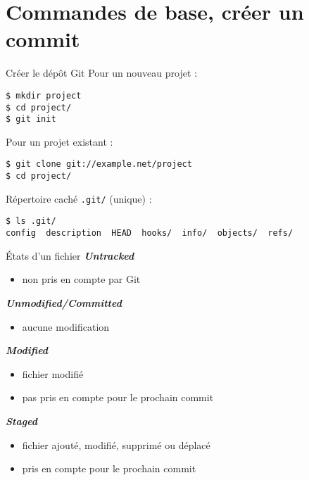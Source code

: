 \section{Commandes de base, créer un commit}

\begin{frame}
  \tableofcontents[sectionstyle=show/shaded]
\end{frame}
\usebackgroundtemplate{}

\begin{frame}[fragile]{Créer le dépôt Git}
  Pour un nouveau projet :
\begin{footnotesize}
\begin{verbatim}
$ mkdir project
$ cd project/
$ git init
\end{verbatim}
\end{footnotesize}

  \pause
  \bigskip
  Pour un projet existant :
\begin{footnotesize}
\begin{verbatim}
$ git clone git://example.net/project
$ cd project/
\end{verbatim}
\end{footnotesize}

  \pause
  \bigskip
  Répertoire caché \texttt{.git/} (unique) :
\begin{footnotesize}
\begin{verbatim}
$ ls .git/
config  description  HEAD  hooks/  info/  objects/  refs/
\end{verbatim}
\end{footnotesize}
\end{frame}

\begin{frame}{États d'un fichier}
  \textit{\textbf{Untracked}}
  \begin{itemize}
    \item non pris en compte par Git
  \end{itemize}

  \pause
  \medskip
  \textit{\textbf{Unmodified/Committed}}
  \begin{itemize}
    \item aucune modification
  \end{itemize}

  \pause
  \medskip
  \textit{\textbf{Modified}}
  \begin{itemize}
    \item fichier modifié
    \item pas pris en compte pour le prochain commit
  \end{itemize}

  \pause
  \medskip
  \textit{\textbf{Staged}}
  \begin{itemize}
    \item fichier ajouté, modifié, supprimé ou déplacé
    \item pris en compte pour le prochain commit
  \end{itemize}
\end{frame}

